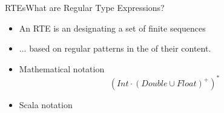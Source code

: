 \begin{frame}{RTEs}{What are Regular Type Expressions?}
  \begin{itemize}
  \item An RTE is an  designating a set  of finite sequences
  \item ... based on regular patterns in the  of their content.
  \item Mathematical notation
    \[(Int \cdot (Double \cup Float)^+)^*\]
  \item Scala notation\\
    \usebox\exnotebox
  \end{itemize}
\end{frame}
